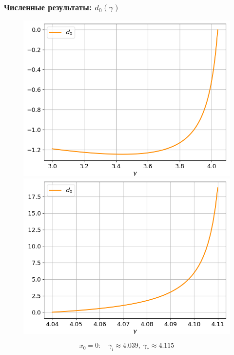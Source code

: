 \documentclass[fullscreen=true, unicode, bookmarks=false]{beamer}
\begin{document}
\begin{frame}
\frametitle{ Численные результаты: $ d_0(\gamma) $ }

\begin{figure} 
\includegraphics[scale=0.37]{divergent_d0_before_0.png}  
\hfill
\includegraphics[scale=0.37]{divergent_d0_after_0.png}  
\end{figure}

$$ x_0 = 0: \quad \gamma_l \approx 4.039, \; \gamma_* \approx 4.115 $$

\end{frame}
\end{document}
